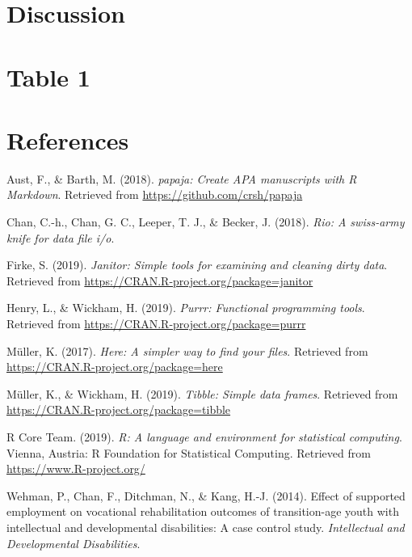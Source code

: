 \documentclass[man]{apa6}
\begin{document}
\section{Discussion}\label{discussion}

\newpage

\section{Table 1}\label{table-1}

\newpage

\section{References}\label{references}

\begingroup
\setlength{\parindent}{-0.5in} \setlength{\leftskip}{0.5in}

\hypertarget{refs}{}
\hypertarget{ref-R-papaja}{}
Aust, F., \& Barth, M. (2018). \emph{papaja: Create APA manuscripts with
R Markdown}. Retrieved from \url{https://github.com/crsh/papaja}

\hypertarget{ref-R-rio}{}
Chan, C.-h., Chan, G. C., Leeper, T. J., \& Becker, J. (2018).
\emph{Rio: A swiss-army knife for data file i/o}.

\hypertarget{ref-R-janitor}{}
Firke, S. (2019). \emph{Janitor: Simple tools for examining and cleaning
dirty data}. Retrieved from
\url{https://CRAN.R-project.org/package=janitor}

\hypertarget{ref-R-purrr}{}
Henry, L., \& Wickham, H. (2019). \emph{Purrr: Functional programming
tools}. Retrieved from \url{https://CRAN.R-project.org/package=purrr}

\hypertarget{ref-R-here}{}
Müller, K. (2017). \emph{Here: A simpler way to find your files}.
Retrieved from \url{https://CRAN.R-project.org/package=here}

\hypertarget{ref-R-tibble}{}
Müller, K., \& Wickham, H. (2019). \emph{Tibble: Simple data frames}.
Retrieved from \url{https://CRAN.R-project.org/package=tibble}

\hypertarget{ref-R-base}{}
R Core Team. (2019). \emph{R: A language and environment for statistical
computing}. Vienna, Austria: R Foundation for Statistical Computing.
Retrieved from \url{https://www.R-project.org/}

\hypertarget{ref-wehman2014}{}
Wehman, P., Chan, F., Ditchman, N., \& Kang, H.-J. (2014). Effect of
supported employment on vocational rehabilitation outcomes of
transition-age youth with intellectual and developmental disabilities: A
case control study. \emph{Intellectual and Developmental Disabilities}.
\end{document}
